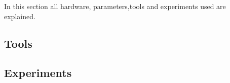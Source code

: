 In this section all hardware, parameters,tools and experiments used are explained.  

\subsection{Tools}
\label{hardware}


\subsection{Experiments}


